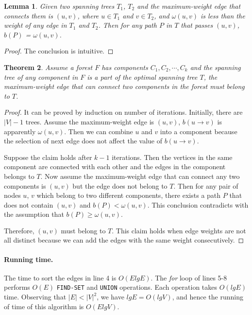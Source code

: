 \documentclass[paper=a4, fontsize=12pt]{scrartcl} %
\newtheorem{theorem}{Theorem}[section]
\newtheorem{lemma}[theorem]{Lemma}
\numberwithin{equation}{section} %
\numberwithin{figure}{section} %
\numberwithin{table}{section} %
\begin{document}
\begin{lemma} Given two spanning trees $T_{1}$, $T_{2}$ and the maximum-weight edge that connects them is $(u, v)$, where $u \in T_{1}$ and  $v \in T_{2}$, and $\omega(u, v)$ is less than the weight of any edge in $T_{1}$ and $T_{2}$. Then for any path $P$ in $T$ that passes $(u, v)$, $b(P)$ = $\omega(u, v)$.
\end{lemma}

\begin{proof} The conclusion is intuitive.
\end{proof}

\begin{theorem} Assume a forest $F$ has components $C_{1}, C_{2}, \cdots, C_{k}$ and the spanning tree of any component in $F$ is a part of the optimal spanning tree $T$, the maximum-weight edge that can connect two components in the forest must belong to $T$. 
\end{theorem}

\begin{proof} It can be proved by induction on number of iterations.
Initially, there are $|V| - 1$ trees. Assume the maximum-weight edge is $(u, v)$, $b(u \to v)$ is apparently $\omega(u, v)$. Then we can combine $u$ and $v$ into a component because the selection of next edge does not affect the value of $b(u \to v)$.
 
Suppose the claim holds after $k - 1$ iterations. Then the vertices in the same component are connected with each other and the edges in the component belongs to $T$. Now assume the maximum-weight edge that can connect any two components is $(u, v)$ but the edge does not belong to $T$. Then for any pair of nodes $u$, $v$ which belong to two different components, there exists a path $P$ that does not contain $(u, v)$ and $b(P) < \omega(u, v)$. This conclusion contradicts with the assumption that $b(P) \geq \omega(u, v)$.\par Therefore, $(u, v)$ must belong to $T$. This claim holds when edge weights are not all distinct because we can add the edges with the same weight consecutively.
\end{proof}
\paragraph{Running time.} The time to sort the edges in line 4 is $O(E lgE)$. The \emph{for} loop of lines 5-8 performs $O(E)$ \texttt{FIND-SET} and \texttt{UNION} operations. Each operation takes $O(lgE)$ time. Observing that $|E| < |V|^{2}$, we have $lgE = O(lg V)$, and hence the running of time of this algorithm is $O(ElgV)$.
\end{document}
